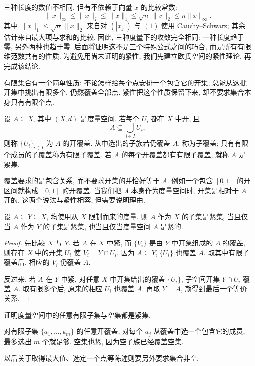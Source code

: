 三种长度的数值不相同, 但有不依赖于向量 $x$ 的比较常数:
\begin{equation}
 \|x\|_\infty\leq\|x\|_2\leq\|x\|_1
 \leq\sqrt n\,\|x\|_2\leq n\|x\|_\infty.
 \label{ch:eucompact:coordinate-norms}
\end{equation}
其中 $\|x\|_1\leq\sqrt n\,\|x\|_2$ 来自对 $(|x_j|)$ 与 $(1)$ 使用 Cauchy--Schwarz; 其余估计来自最大项与求和的比较. 因此, 三种度量下的收敛完全相同: 一种长度趋于零, 另外两种也趋于零. 后面将证明这不是三个特殊公式之间的巧合, 而是所有有限维范数共有的性质. 为避免用尚未证明的紧性, 我们先建立欧氏空间的紧性理论, 再完成该结论.

\label{ch:eucompact:open-covers}

有限集合有一个简单性质: 不论怎样给每个点安排一个包含它的开集, 总能从这批开集中挑出有限多个, 仍然覆盖全部点. 紧性把这个性质保留下来, 却不要求集合本身只有有限个点.

\begin{definition}[开覆盖与紧集]
设 $A\subseteq X$, 其中 $(X,d)$ 是度量空间. 若每个 $U_i$ 都在 $X$ 中开, 且
\[
 A\subseteq\bigcup_{i\in I}U_i,
\]
则称 $\{U_i\}_{i\in I}$ 为 $A$ 的开覆盖. 从中选出的子族若仍覆盖 $A$, 称为子覆盖; 只有有限个成员的子覆盖称为有限子覆盖. 若 $A$ 的每个开覆盖都有有限子覆盖, 就称 $A$ 是紧集.
\end{definition}

覆盖要求的是包含关系, 而不要求开集的并恰好等于 $A$. 例如一个包含 $[0,1]$ 的开区间就构成 $[0,1]$ 的开覆盖. 当我们把 $A$ 本身作为度量空间时, 开集是相对于 $A$ 开的. 这两个说法与紧性相容, 但需要说明理由.

\begin{proposition}[紧性与子空间]
\label{ch:eucompact:subspace}
设 $A\subseteq Y\subseteq X$, 均使用从 $X$ 限制而来的度量. 则 $A$ 作为 $X$ 的子集是紧集, 当且仅当 $A$ 作为 $Y$ 的子集是紧集, 也当且仅当度量空间 $A$ 是紧的.
\end{proposition}
\begin{proof}
先比较 $X$ 与 $Y$. 若 $A$ 在 $X$ 中紧, 而 $\{V_i\}$ 是由 $Y$ 中开集组成的 $A$ 的覆盖, 则存在 $X$ 中的开集 $U_i$ 使 $V_i=Y\cap U_i$. 因为 $A\subseteq Y$, $\{U_i\}$ 也覆盖 $A$. 取其中有限子覆盖后, 相应的 $V_i$ 仍覆盖 $A$.

反过来, 若 $A$ 在 $Y$ 中紧, 对任意 $X$ 中开集给出的覆盖 $\{U_i\}$, 子空间开集 $Y\cap U_i$ 覆盖 $A$. 取有限多个后, 原来的相应 $U_i$ 也覆盖 $A$. 再取 $Y=A$, 就得到最后一个等价关系.
\end{proof}

\begin{example}
证明度量空间中的任意有限子集与空集都是紧集.
\end{example}
\begin{solution}
对有限子集 $\{a_1,\ldots,a_m\}$ 的任意开覆盖, 对每个 $a_j$ 从覆盖中选一个包含它的成员, 最多选出 $m$ 个就足够. 空集也紧, 因为空子族已经覆盖空集.
\end{solution}
以后关于取得最大值、选定一个点等陈述则要另外要求集合非空.

